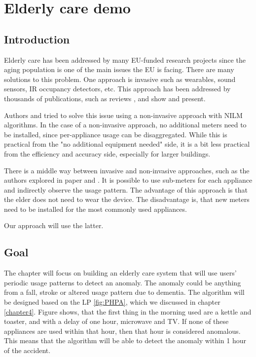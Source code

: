 \chapter{Elderly care demo} %

\label{chapter6} %


\section{Introduction}


Elderly care has been addressed by many EU-funded research projects since the aging population is one of the main issues the EU is facing. 
There are many solutions to this problem.
One approach is invasive such as wearables, sound sensors, IR occupancy detectors, etc. 
This approach has been addressed by thousands of publications, such as reviews \cite{elderReview1}, \cite{elderReview2} and \cite{elderReview3} show and present.

Authors \cite{elderNILM} and \cite{elderNILMDementia} tried to solve this issue using a non-invasive approach with NILM algorithms. 
In the case of a non-invasive approach, no additional meters need to be installed, since per-appliance usage can be disaggregated.
While this is practical from the "no additional equipment needed" side, it is a bit less practical from the efficiency and accuracy side, especially for larger buildings. 

There is a middle way between invasive and non-invasive approaches, such as the authors explored in paper \cite{elder1} and \cite{elder2}. 
It is possible to use sub-meters for each appliance and indirectly observe the usage pattern. 
The advantage of this approach is that the elder does not need to wear the device.
The disadvantage is, that new meters need to be installed for the most commonly used appliances.

Our approach will use the latter.

\section{Goal}

The chapter will focus on building an elderly care system that will use users' periodic usage patterns to detect an anomaly.
The anomaly could be anything from a fall, stroke or altered usage pattern due to dementia. 
The algorithm will be designed based on the LP \ref{fig:PHPA}, which we discussed in chapter \ref{chapter4}.
Figure shows, that the first thing in the morning used are a kettle and toaster, and with a delay of one hour, microwave and TV. 
If none of these appliances are used within that hour, then that hour is considered anomalous.
This means that the algorithm will be able to detect the anomaly within 1 hour of the accident.

